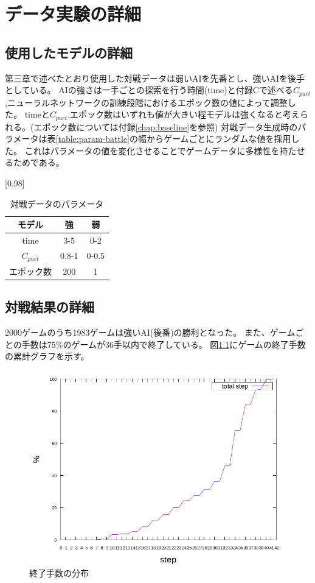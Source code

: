 \chapter{データ実験の詳細}
\label{chap:data}
\section{使用したモデルの詳細}
第三章で述べたとおり使用した対戦データは弱いAIを先番とし、強いAIを後手としている。
AIの強さは一手ごとの探索を行う時間(time)と付録Cで述べる$C_{puct}$,ニューラルネットワークの訓練段階におけるエポック数の値によって調整した。
timeと$C_{puct}$,エポック数はいずれも値が大きい程モデルは強くなると考えられる。(エポック数については付録\ref{chap:baseline}を参照)
対戦データ生成時のパラメータは表\ref{table:param-battle}の幅からゲームごとにランダムな値を採用した。
これはパラメータの値を変化させることでゲームデータに多様性を持たせるためである。
\begin{table}[H]
	\caption{対戦データのパラメータ}
	\label{table:param-battle}
	\centering
	\scalebox{0.98}[0.98]{
		\begin{tabular}{c|c|c}
			モデル&強&弱\\ \hline
			time    & 3-5 & 0-2 \\ 
			$C_{puct}$ & 0.8-1   & 0-0.5 \\
			エポック数 & 200 & 1 \\

		\end{tabular}
	}
	\label{table:battle}
\end{table}

\section{対戦結果の詳細}
2000ゲームのうち1983ゲームは強いAI(後番)の勝利となった。
また、ゲームごとの手数は75\%のゲームが36手以内で終了している。
図\ref{fig:stepCum}にゲームの終了手数の累計グラフを示す。
\begin{figure}[t]
	\centering
	\includegraphics[width=\linewidth]{./figure/stepCum.png}
	\caption{終了手数の分布}
	\label{fig:stepCum}
\end{figure}
